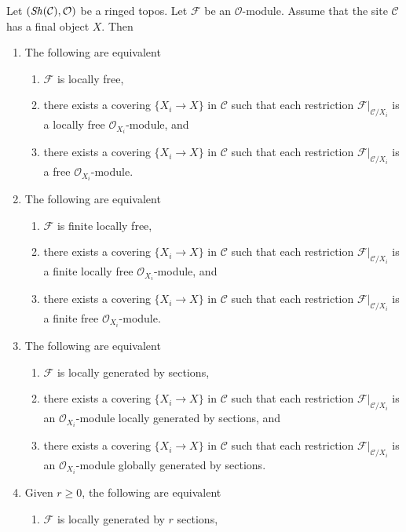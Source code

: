 \begin{lemma}
\label{lemma-local-final-object}
Let $(\mathop{\mathit{Sh}}\nolimits(\mathcal{C}), \mathcal{O})$
be a ringed topos. Let $\mathcal{F}$ be an $\mathcal{O}$-module.
Assume that the site $\mathcal{C}$ has a final object $X$.
Then
\begin{enumerate}
\item The following are equivalent
\begin{enumerate}
\item $\mathcal{F}$ is locally free,
\item there exists a covering $\{X_i \to X\}$ in $\mathcal{C}$ such that
each restriction $\mathcal{F}|_{\mathcal{C}/X_i}$ is a locally free
$\mathcal{O}_{X_i}$-module, and
\item there exists a covering $\{X_i \to X\}$ in $\mathcal{C}$ such that
each restriction $\mathcal{F}|_{\mathcal{C}/X_i}$ is a free
$\mathcal{O}_{X_i}$-module.
\end{enumerate}
\item The following are equivalent
\begin{enumerate}
\item $\mathcal{F}$ is finite locally free,
\item there exists a covering $\{X_i \to X\}$ in $\mathcal{C}$
such that each restriction $\mathcal{F}|_{\mathcal{C}/X_i}$
is a finite locally free $\mathcal{O}_{X_i}$-module, and
\item there exists a covering $\{X_i \to X\}$ in $\mathcal{C}$
such that each restriction $\mathcal{F}|_{\mathcal{C}/X_i}$
is a finite free $\mathcal{O}_{X_i}$-module.
\end{enumerate}
\item The following are equivalent
\begin{enumerate}
\item $\mathcal{F}$ is locally generated by sections,
\item there exists a covering $\{X_i \to X\}$ in $\mathcal{C}$
such that each restriction $\mathcal{F}|_{\mathcal{C}/X_i}$
is an $\mathcal{O}_{X_i}$-module locally generated by sections, and
\item there exists a covering $\{X_i \to X\}$ in $\mathcal{C}$
such that each restriction $\mathcal{F}|_{\mathcal{C}/X_i}$
is an $\mathcal{O}_{X_i}$-module globally generated by sections.
\end{enumerate}
\item Given $r \geq 0$, the following are equivalent
\begin{enumerate}
\item $\mathcal{F}$ is locally generated by $r$ sections,

\end{enumerate}
\end{enumerate}
\end{lemma}
